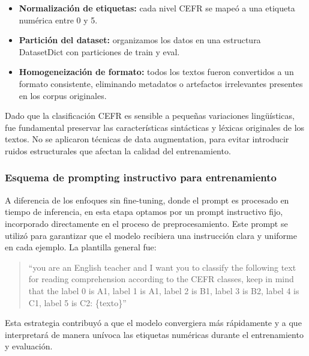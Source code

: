 \begin{itemize}
    \item \textbf{Normalización de etiquetas:} cada nivel CEFR se mapeó a una etiqueta numérica entre 0 y 5.
    \item \textbf{Partición del dataset:} organizamos los datos en una estructura DatasetDict con particiones de train y eval.
    \item \textbf{Homogeneización de formato:} todos los textos fueron convertidos a un formato consistente, eliminando metadatos o artefactos irrelevantes presentes en los corpus originales.
\end{itemize}

Dado que la clasificación CEFR es sensible a pequeñas variaciones lingüísticas, fue fundamental preservar las características sintácticas y léxicas originales de los textos. No se aplicaron técnicas de data augmentation, para evitar introducir ruidos estructurales que afectan la calidad del entrenamiento.

\subsubsection{Esquema de prompting instructivo para entrenamiento}
A diferencia de los enfoques sin fine-tuning, donde el prompt es procesado en tiempo de inferencia, en esta etapa optamos por un prompt instructivo fijo, incorporado directamente en el proceso de preprocesamiento. Este prompt se utilizó para garantizar que el modelo recibiera una instrucción clara y uniforme en cada ejemplo. La plantilla general fue:

\begin{quote}
``you are an English teacher and I want you to classify the following text for reading comprehension according to the CEFR classes, keep in mind that the label 0 is A1, label 1 is A1, label 2 is B1, label 3 is B2, label 4 is C1, label 5 is C2:
\{texto\}''  
\end{quote}

Esta estrategia contribuyó a que el modelo convergiera más rápidamente y a que interpretará de manera unívoca las etiquetas numéricas durante el entrenamiento y evaluación.

